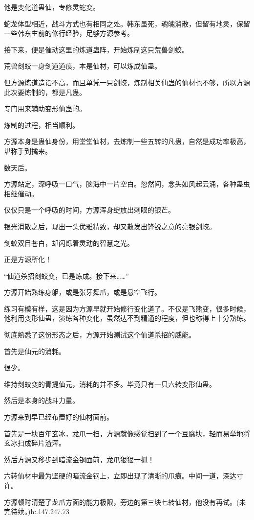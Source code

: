 \begin{this_body}
他是变化道蛊仙，专修灵蛇变。

蛇龙体型相近，战斗方式也有相同之处。韩东虽死，魂魄消散，但留有地灵，保留一些韩东生前的修行经验，足够方源参考。

接下来，便是催动这里的炼道蛊阵，开始炼制这只荒兽剑蛟。

荒兽剑蛟一身剑道道痕，本是仙材，可以炼成仙蛊。

但方源炼道造诣不高，而且单凭一只剑蛟，炼制相关仙蛊的仙材也不够，所以方源此次要炼制的，都是凡蛊。

专门用来辅助变形仙蛊的。

炼制的过程，相当顺利。

方源本身是蛊仙身份，用堂堂仙材，去炼制一些五转的凡蛊，自然是成功率极高，堪称手到擒来。

数天后。

方源站定，深呼吸一口气，脑海中一片空白。忽然间，念头如风起云涌，各种蛊虫相继催动。

仅仅只是一个呼吸的时间，方源浑身绽放出刺眼的银芒。

银光消散之后，现出一头优雅精致，却又散发出锋锐之意的亮银剑蛟。

剑蛟双目苍白，却闪烁着灵动的智慧之光。

正是方源所化！

“仙道杀招剑蛟变，已是炼成。接下来……”

方源开始熟练身躯，或是张牙舞爪，或是悬空飞行。

练习有模有样，这是因为方源早就开始修行变化道了。不仅是飞熊变，很多时候，他利用变形仙蛊，演练各种变化，虽然达不到精通的程度，但也称得上十分熟练。

彻底熟悉了这份形态之后，方源开始测试这个仙道杀招的威能。

首先是仙元的消耗。

很少。

维持剑蛟变的青提仙元，消耗的并不多。毕竟只有一只六转变形仙蛊。

然后是本身的战斗力量。

方源来到早已经布置好的仙材面前。

首先是一块百年玄冰，龙爪一扫，方源就像感觉扫到了一个豆腐块，轻而易举地将玄冰扫成碎片渣滓。

然后方源又移步到暗流金钢面前，龙爪狠狠一抓！

六转仙材中最为坚硬的暗流金钢上，立即出现了清晰的爪痕。中间一道，深达寸许。

方源顿时清楚了龙爪方面的能力极限，旁边的第三块七转仙材，他没有再试。(未完待续。)h:.147.247.73

\end{this_body}

